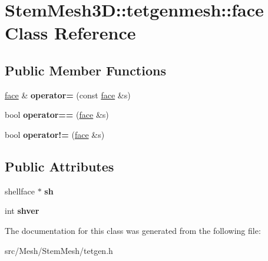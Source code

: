 \hypertarget{classStemMesh3D_1_1tetgenmesh_1_1face}{}\section{Stem\+Mesh3D\+:\+:tetgenmesh\+:\+:face Class Reference}
\label{classStemMesh3D_1_1tetgenmesh_1_1face}
\subsection*{Public Member Functions}
\begin{DoxyCompactItemize}
\item 
\mbox{\label{classStemMesh3D_1_1tetgenmesh_1_1face_a1c9f12be9677eed2dfb2e4a7e0377a43}} 
\hyperlink{classStemMesh3D_1_1tetgenmesh_1_1face}{face} \& {\bfseries operator=} (const \hyperlink{classStemMesh3D_1_1tetgenmesh_1_1face}{face} \&s)
\item 
\mbox{\label{classStemMesh3D_1_1tetgenmesh_1_1face_a5870f2ca141bdf00100d459bce96f904}} 
bool {\bfseries operator==} (\hyperlink{classStemMesh3D_1_1tetgenmesh_1_1face}{face} \&s)
\item 
\mbox{\label{classStemMesh3D_1_1tetgenmesh_1_1face_aa93c4956efb5323ce6e5ec1ef8e6d108}} 
bool {\bfseries operator!=} (\hyperlink{classStemMesh3D_1_1tetgenmesh_1_1face}{face} \&s)
\end{DoxyCompactItemize}
\subsection*{Public Attributes}
\begin{DoxyCompactItemize}
\item 
\mbox{\label{classStemMesh3D_1_1tetgenmesh_1_1face_af81d93597724b3319c0b5e51e1d89665}} 
shellface $\ast$ {\bfseries sh}
\item 
\mbox{\label{classStemMesh3D_1_1tetgenmesh_1_1face_aff1fa90784a7d7998549cf4854971dad}} 
int {\bfseries shver}
\end{DoxyCompactItemize}


The documentation for this class was generated from the following file\+:\begin{DoxyCompactItemize}
\item 
src/\+Mesh/\+Stem\+Mesh/tetgen.\+h\end{DoxyCompactItemize}
